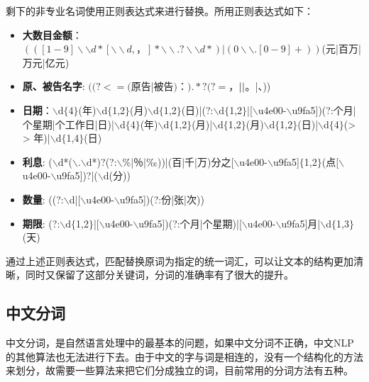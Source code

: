 剩下的非专业名词使用正则表达式来进行替换。所用正则表达式如下：
\begin{itemize}
	\item \textbf{大数目金额}：$(([1-9]\backslash \backslash d*[\backslash \backslash d,，]*\backslash \backslash .?\backslash \backslash d*)|(0\backslash \backslash .[0-9]+))$(元|百万|万元|亿元)

	\item \textbf{原、被告名字}: $((?<=($原告|被告$)$：$).*?(?=$，$|\/|$。|、))

	\item \textbf{日期}：$\backslash$d$\{$4$\}$(年)$\backslash$d$\{$1,2$\}$(月)$\backslash$d$\{$1,2$\}$(日)|(?:$\backslash$d$\{$1,2$\}$|[$\backslash$u4e00-$\backslash$u9fa5])(?:个月|个星期|个工作日|日)|$\backslash$d$\{$4$\}$(年)$\backslash$d$\{$1,2$\}$(月)|$\backslash$d$\{$1,2$\}$(月)$\backslash$d$\{$1,2$\}$(日)|$\backslash$d$\{$4$\}$(> >
	年)|$\backslash$d$\{$1,4$\}$(日)

	\item \textbf{利息}: ($\backslash$d*($\backslash$.$\backslash$d*)?(?:$\backslash$\%|％|‰))|(百|千|万)分之[$\backslash$u4e00-$\backslash$u9fa5]$\{$1,2$\}$(点[$\backslash$u4e00-$\backslash$u9fa5])?|($\backslash$d(分))

	\item \textbf{数量}: ((?:$\backslash$d|[$\backslash$u4e00-$\backslash$u9fa5])(?:份|张|次))
	
	\item \textbf{期限}: (?:$\backslash$d$\{$1,2$\}$|[$\backslash$u4e00-$\backslash$u9fa5])(?:个月|个星期)|[$\backslash$u4e00-$\backslash$u9fa5]月|$\backslash$d$\{$1,3$\}$(天)
\end{itemize}

通过上述正则表达式，匹配替换原词为指定的统一词汇，可以让文本的结构更加清晰，同时又保留了这部分关键词，分词的准确率有了很大的提升。

\subsection{中文分词}
中文分词，是自然语言处理中的最基本的问题，如果中文分词不正确，中文NLP的其他算法也无法进行下去。由于中文的字与词是相连的，没有一个结构化的方法来划分，故需要一些算法来把它们分成独立的词，目前常用的分词方法有五种。

